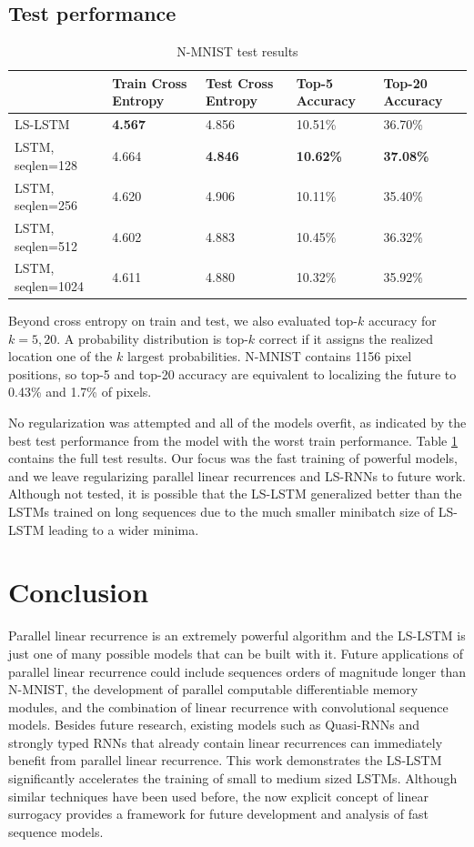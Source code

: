 \documentclass{article}
\begin{document}
\subsection{Test performance}
\begin{table}[h]
  \caption{N-MNIST test results}
  \label{test-results}
  \centering
  \begin{tabular}{lllll}
    \toprule
    & Train Cross Entropy     & Test Cross Entropy     & Top-5 Accuracy & Top-20 Accuracy \\
    \midrule
    LS-LSTM 			&  \textbf{4.567} & 4.856           & 10.51\% & 36.70\%   \\
    LSTM, seqlen=128    & 4.664 & \textbf{4.846}  & \textbf{10.62\%} & \textbf{37.08\%}   \\
    LSTM, seqlen=256    & 4.620                & 4.906           & 10.11\% & 35.40\%   \\
    LSTM, seqlen=512    & 4.602                & 4.883           & 10.45\% & 36.32\%   \\
    LSTM, seqlen=1024   & 4.611                & 4.880           & 10.32\% & 35.92\%   \\
    \bottomrule
  \end{tabular}
\end{table}
Beyond cross entropy on train and test, we also evaluated top-$k$ accuracy for $k=5, 20$. A probability distribution is top-$k$ correct if it assigns the realized location one of the
$k$ largest probabilities. N-MNIST contains 1156 pixel positions, so top-5 and top-20 accuracy are equivalent to localizing the future to 0.43\% and 1.7\% of pixels. 

No regularization was attempted and all of the models overfit, as indicated by the best test performance from the model with the worst train performance. Table \ref{test-results} contains the full test results. Our focus was the fast training of powerful models, and we leave regularizing parallel linear recurrences and LS-RNNs to future work. Although not tested, it is possible that the LS-LSTM generalized better than the LSTMs trained on long sequences due to the much smaller minibatch size of LS-LSTM leading to a wider minima.

\section{Conclusion}
Parallel linear recurrence is an extremely powerful algorithm and the LS-LSTM is just one
of many possible models that can be built with it. Future applications of parallel linear recurrence could include sequences orders of magnitude longer than N-MNIST, the development of parallel computable differentiable memory modules, and the combination of linear recurrence with convolutional sequence models. Besides future research, existing models such as Quasi-RNNs and strongly typed RNNs that already contain linear recurrences can immediately benefit from parallel linear recurrence. This work demonstrates the LS-LSTM significantly accelerates the training of small to medium sized LSTMs. Although similar techniques have been used before, the now explicit concept of linear surrogacy provides a framework for future development and analysis of fast sequence models.
\end{document}
